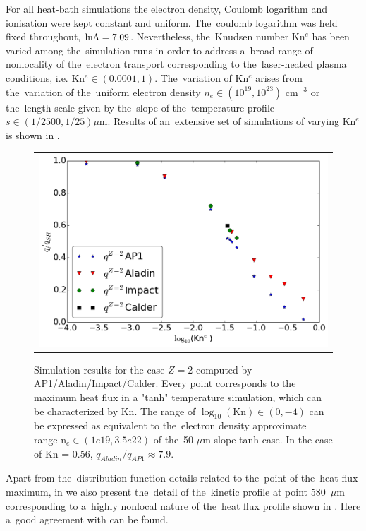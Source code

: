 For all heat-bath simulations the electron density, Coulomb logarithm and 
ionisation were kept constant and uniform.
The~coulomb logarithm was held fixed throughout, 
$\text{ln}\Lambda = 7.09$.
Nevertheless, the~Knudsen number Kn$^e$ has been varied among the~simulation 
runs in order to address a~broad range of nonlocality of 
the~electron transport corresponding 
to the~laser-heated plasma conditions, i.e. Kn$^e \in (0.0001, 1)$. 
The~variation of Kn$^e$ arises from the~variation
of the~uniform electron density $n_e \in (10^{19}, 10^{23})$ cm$^{-3}$ or 
the~length scale given by the~slope of the~temperature profile 
$s \in (1/2500, 1/25) \mu$m. Results of an~extensive set of simulations of
varying Kn$^e$ is shown in .
 
\begin{figure}[tbh]
  \begin{center}
    \begin{tabular}{c}
      \includegraphics[width=\figscale\textwidth]{Kn_results.png}
    \end{tabular}
  \caption{  
  Simulation results for the case $Z=2$ computed by AP1/Aladin/Impact/Calder.
  Every point corresponds to the maximum heat flux in a "tanh" temperature 
  simulation, which can be characterized by Kn. The range of 
  $\log_{10}(\text{Kn})\in (0, -4)$ can be expressed as equivalent 
  to the~electron density approximate range n$_e \in (1e19, 3.5e22)$ of 
  the~50 $\mu$m slope tanh case. In the case of Kn = 0.56, 
  $q_{Aladin} / q_{AP1}\approx 7.9$.}
  \label{fig:Kn_results}
  \end{center} 
\end{figure}

Apart from the~distribution function details related to the~point of 
the~heat flux maximum, in 
we also present the~detail of the~kinetic profile at point 580~$\mu$m 
corresponding to a~highly nonlocal nature of the~heat flux profile shown in
. Here a~good agreement with
\cite{Sherlock_PoP2017} can be found.

